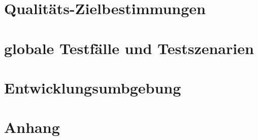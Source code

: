\documentclass[parskip=full]{scrartcl}
\begin{document}
\section{Qualitäts-Zielbestimmungen}

\section{globale Testfälle und Testszenarien}

\section{Entwicklungsumbgebung}

\section{Anhang}	
\end{document}
